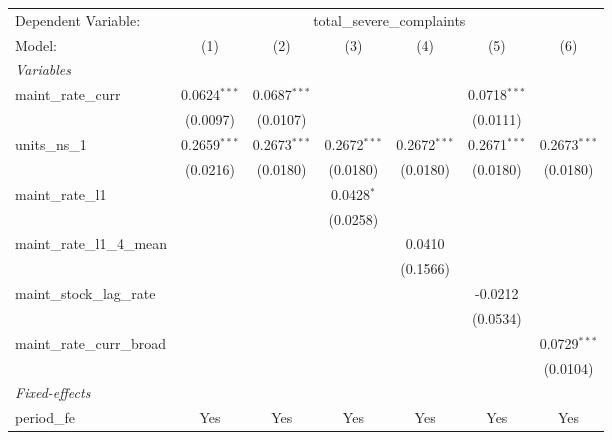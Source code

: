 \documentclass[
  11pt,
]{article}
\begin{document}
\begin{adjustbox}{max width=\textwidth}
\begingroup
\centering
\begin{tabular}{lcccccc}
   \tabularnewline \midrule \midrule
   Dependent Variable: & \multicolumn{6}{c}{total\_severe\_complaints}\\
   Model:                       & (1)            & (2)            & (3)            & (4)            & (5)            & (6)\\  
   \midrule
   \emph{Variables}\\
   maint\_rate\_curr            & 0.0624$^{***}$ & 0.0687$^{***}$ &                &                & 0.0718$^{***}$ &   \\   
                                & (0.0097)       & (0.0107)       &                &                & (0.0111)       &   \\   
   units\_ns\_1                 & 0.2659$^{***}$ & 0.2673$^{***}$ & 0.2672$^{***}$ & 0.2672$^{***}$ & 0.2671$^{***}$ & 0.2673$^{***}$\\   
                                & (0.0216)       & (0.0180)       & (0.0180)       & (0.0180)       & (0.0180)       & (0.0180)\\   
   maint\_rate\_l1              &                &                & 0.0428$^{*}$   &                &                &   \\   
                                &                &                & (0.0258)       &                &                &   \\   
   maint\_rate\_l1\_4\_mean     &                &                &                & 0.0410         &                &   \\   
                                &                &                &                & (0.1566)       &                &   \\   
   maint\_stock\_lag\_rate      &                &                &                &                & -0.0212        &   \\   
                                &                &                &                &                & (0.0534)       &   \\   
   maint\_rate\_curr\_broad     &                &                &                &                &                & 0.0729$^{***}$\\   
                                &                &                &                &                &                & (0.0104)\\   
   \midrule
   \emph{Fixed-effects}\\
   period\_fe                   & Yes            & Yes            & Yes            & Yes            & Yes            & Yes\\  

\end{tabular}
\end{adjustbox}
\end{document}
